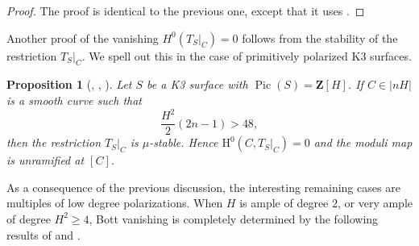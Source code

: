 \documentclass[a4paper,12pt,twoside,reqno]{amsart}
\numberwithin{equation}{section}
\theoremstyle{plain}
\newtheorem{proposition}[theorem]{Proposition}
\theoremstyle{definition}
\DeclareMathOperator{\Pic}{Pic}
\newcommand{\ZZ}{\mathbf{Z}}
\newcommand{\HH}{\mathrm{H}}
\theoremstyle{plain}
\theoremstyle{definition}
\begin{document}
\begin{proof}
The proof is identical to the previous one, except that it uses \cite[Theorem~5.1]{Totaro}. 
\end{proof}



Another proof of the vanishing $H^0(T_S|_C)=0$ follows from the stability of the restriction $T_S|_C$. We spell out this in the case of primitively polarized K3 surfaces.

\begin{proposition}[{\cite[Theorem 2.8]{Hein}, \cite{GO}, \cite{DH}}]\label{prop:stability}
Let $S$ be a K3 surface with $\Pic(S)=\ZZ[H]$. If $C\in |nH|$ is a smooth curve such that
\[
\frac{H^2}{2}(2n-1)>48,
\]
then the restriction $T_S|_C$ is $\mu$-stable. Hence $\HH^0(C,T_S|_C)=0$ and the moduli map is unramified at $[C]$.
\end{proposition}





As a consequence of the previous discussion, the interesting remaining  cases are multiples of low degree polarizations. When $H$ is ample of degree $2$, or very ample of degree $H^2 \geq 4$, Bott vanishing is completely determined by the following results of  \cite{DedieuSernesi} and \cite{KnutsenNormal}.
\end{document}
